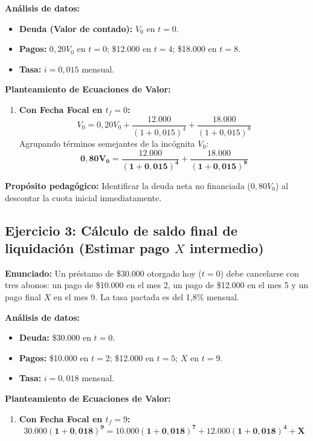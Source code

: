 \documentclass[11pt, a4paper]{article}
\begin{document}
\textbf{Análisis de datos:}
\begin{itemize}
    \item \textbf{Deuda (Valor de contado):} $V_0$ en $t=0$.
    \item \textbf{Pagos:} $0,20 V_0$ en $t=0$; \$12.000 en $t=4$; \$18.000 en $t=8$.
    \item \textbf{Tasa:} $i = 0,015$ mensual.
\end{itemize}

\textbf{Planteamiento de Ecuaciones de Valor:}
\begin{enumerate}[label=\alph*)]
    \item \textbf{Con Fecha Focal en $t_f = 0$:}
    \[
    V_0 = 0,20 V_0 + \frac{12.000}{(1 + 0,015)^4} + \frac{18.000}{(1 + 0,015)^8}
    \]
    Agrupando términos semejantes de la incógnita $V_0$:
    \[
    \mathbf{0,80 V_0 = \frac{12.000}{(1 + 0,015)^4} + \frac{18.000}{(1 + 0,015)^8}}
    \]
\end{enumerate}

\textbf{Propósito pedagógico:} Identificar la deuda neta no financiada ($0,80 V_0$) al descontar la cuota inicial inmediatamente.

\vspace{0.2cm}

\subsection*{\color{secondary} Ejercicio 3: Cálculo de saldo final de liquidación (Estimar pago $X$ intermedio)}
\textbf{Enunciado:} Un préstamo de \$30.000 otorgado hoy ($t=0$) debe cancelarse con tres abonos: un pago de \$10.000 en el mes 2, un pago de \$12.000 en el mes 5 y un pago final $X$ en el mes 9. La tasa pactada es del 1,8\% mensual.

\textbf{Análisis de datos:}
\begin{itemize}
    \item \textbf{Deuda:} \$30.000 en $t=0$.
    \item \textbf{Pagos:} \$10.000 en $t=2$; \$12.000 en $t=5$; $X$ en $t=9$.
    \item \textbf{Tasa:} $i = 0,018$ mensual.
\end{itemize}

\textbf{Planteamiento de Ecuaciones de Valor:}
\begin{enumerate}[label=\alph*)]
    \item \textbf{Con Fecha Focal en $t_f = 9$:}
    \[
    \mathbf{30.000(1 + 0,018)^9 = 10.000(1 + 0,018)^7 + 12.000(1 + 0,018)^4 + X}
    \]
\end{enumerate}
\end{document}

